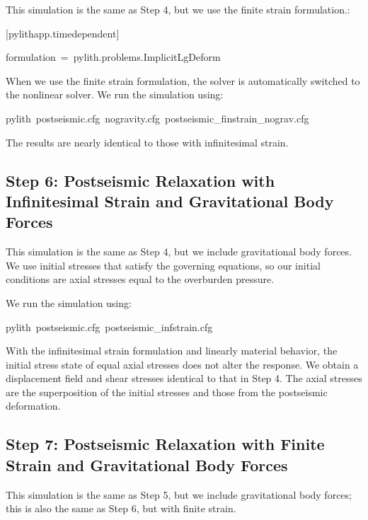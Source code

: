 This simulation is the same as Step 4, but we use the finite strain
formulation.:
\begin{lyxcode}
{[}pylithapp.timedependent{]}

formulation~=~pylith.problems.ImplicitLgDeform
\end{lyxcode}
When we use the finite strain formulation, the solver is automatically
switched to the nonlinear solver. We run the simulation using:
\begin{lyxcode}
pylith~postseismic.cfg~nogravity.cfg~postseismic\_finstrain\_nograv.cfg
\end{lyxcode}
The results are nearly identical to those with infinitesimal strain.


\subsection{Step 6: Postseismic Relaxation with Infinitesimal Strain and Gravitational
Body Forces}

This simulation is the same as Step 4, but we include gravitational
body forces. We use initial stresses that satisfy the governing equations,
so our initial conditions are axial stresses equal to the overburden
pressure. 

We run the simulation using:
\begin{lyxcode}
pylith~postseismic.cfg~postseismic\_infstrain.cfg
\end{lyxcode}
With the infinitesimal strain formulation and linearly material behavior,
the initial stress state of equal axial stresses does not alter the
response. We obtain a displacement field and shear stresses identical
to that in Step 4. The axial stresses are the superposition of the
initial stresses and those from the postseismic deformation.


\subsection{Step 7: Postseismic Relaxation with Finite Strain and Gravitational
Body Forces}

This simulation is the same as Step 5, but we include gravitational
body forces; this is also the same as Step 6, but with finite strain.

